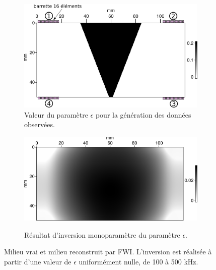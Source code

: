\begin{figure}[!h]
	\begin{subfigure}[b]{0.5\textwidth}
		\centering
		\includegraphics[width=\textwidth]{img/epsilon/epsilon_true.png}
		\caption{Valeur du paramètre $\epsilon$ pour la génération des données observées. \label{configuration_vti} }
	\end{subfigure}
	\begin{subfigure}[b]{0.5\textwidth}
		\centering
		\includegraphics[width=\textwidth]{img/epsilon/epsilon_final.png}\\
		\vspace{0.4cm}
		\caption{Résultat d'inversion monoparamètre du paramètre $\epsilon$.\label{app:ani:res}}
	\end{subfigure}	
	\caption{Milieu vrai et milieu reconstruit par FWI. L'inversion est réalisée à partir d'une valeur de $\epsilon$ uniformément nulle, de 100 à 500 kHz.}
\end{figure}

